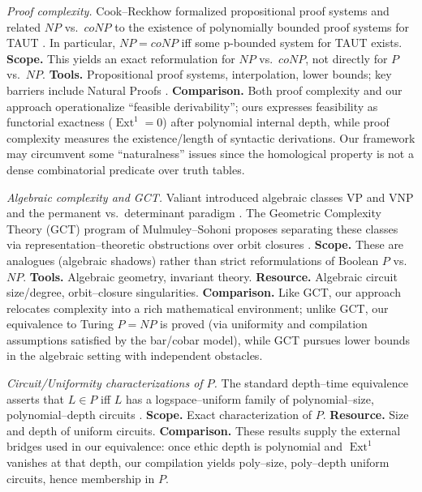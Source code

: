 \documentclass[12pt]{article}
\newcommand{\Ext}{\operatorname{Ext}}
\theoremstyle{plain}
\theoremstyle{definition}
\theoremstyle{remark}
\numberwithin{equation}{section}
\begin{document}
\emph{Proof complexity.} Cook–Reckhow formalized propositional proof systems and related $NP$ vs.\ $coNP$ to the existence of polynomially bounded proof systems for TAUT \cite{CookReckhow1979}. In particular, $NP=coNP$ iff some p-bounded system for TAUT exists. \textbf{Scope.} This yields an exact reformulation for $NP$ vs.\ $coNP$, not directly for $P$ vs.\ $NP$. \textbf{Tools.} Propositional proof systems, interpolation, lower bounds; key barriers include Natural Proofs \cite{RazborovRudich1997}. \textbf{Comparison.} Both proof complexity and our approach operationalize ``feasible derivability''; ours expresses feasibility as functorial exactness ($\Ext^1=0$) after polynomial internal depth, while proof complexity measures the existence/length of syntactic derivations. Our framework may circumvent some ``naturalness'' issues since the homological property is not a dense combinatorial predicate over truth tables.

\emph{Algebraic complexity and GCT.} Valiant introduced algebraic classes VP and VNP and the permanent vs.\ determinant paradigm \cite{Valiant1979}. The Geometric Complexity Theory (GCT) program of Mulmuley–Sohoni proposes separating these classes via representation–theoretic obstructions over orbit closures \cite{MulmuleySohoni2001,Mulmuley2008}. \textbf{Scope.} These are analogues (algebraic shadows) rather than strict reformulations of Boolean $P$ vs.\ $NP$. \textbf{Tools.} Algebraic geometry, invariant theory. \textbf{Resource.} Algebraic circuit size/degree, orbit–closure singularities. \textbf{Comparison.} Like GCT, our approach relocates complexity into a rich mathematical environment; unlike GCT, our equivalence to Turing $P{=}NP$ is proved (via uniformity and compilation assumptions satisfied by the bar/cobar model), while GCT pursues lower bounds in the algebraic setting with independent obstacles.

\emph{Circuit/Uniformity characterizations of $P$.} The standard depth–time equivalence asserts that $L\in P$ iff $L$ has a logspace–uniform family of polynomial–size, polynomial–depth circuits \cite{Sipser2013,AroraBarak2009,PippengerFischer1979}. \textbf{Scope.} Exact characterization of $P$. \textbf{Resource.} Size and depth of uniform circuits. \textbf{Comparison.} These results supply the external bridges used in our equivalence: once ethic depth is polynomial and $\Ext^1$ vanishes at that depth, our compilation yields poly–size, poly–depth uniform circuits, hence membership in $P$.
\end{document}
